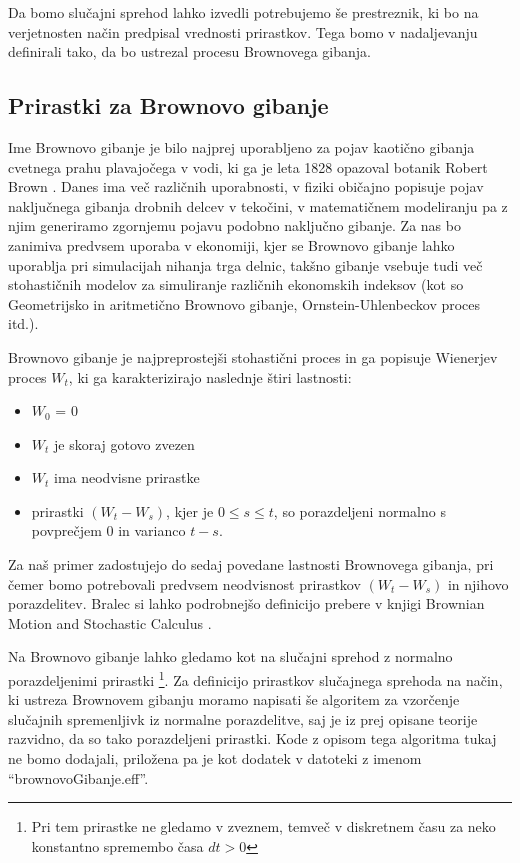 \documentclass[a4paper,12pt]{article}
\theoremstyle{definition} %
\begin{document}
Da bomo slučajni sprehod lahko izvedli potrebujemo še prestreznik, ki bo na verjetnosten način predpisal vrednosti prirastkov. Tega bomo v nadaljevanju definirali tako, da bo ustrezal procesu Brownovega gibanja.

\subsection{Prirastki za Brownovo gibanje}

Ime Brownovo gibanje je bilo najprej uporabljeno za pojav kaotično gibanja cvetnega prahu plavajočega v vodi, ki ga je leta 1828 opazoval botanik Robert Brown \cite{brownovoG}. Danes ima več različnih uporabnosti, v fiziki običajno popisuje pojav naključnega gibanja drobnih delcev v tekočini, v matematičnem modeliranju pa z njim generiramo zgornjemu pojavu podobno naključno gibanje. Za nas bo zanimiva predvsem uporaba v ekonomiji, kjer se Brownovo gibanje lahko uporablja pri simulacijah nihanja trga delnic, takšno gibanje vsebuje tudi več  stohastičnih modelov za simuliranje različnih ekonomskih indeksov (kot so Geometrijsko in aritmetično Brownovo gibanje, Ornstein-Uhlenbeckov proces itd.).

Brownovo gibanje je najpreprostejši stohastični proces in ga popisuje Wienerjev proces $W_t$, ki ga karakterizirajo naslednje štiri lastnosti:
\begin{itemize}
 \item $W_0$ = 0
  \item $W_t$ je skoraj gotovo zvezen
  \item $W_t$ ima neodvisne prirastke
  \item prirastki $(W_t - W_s)$, kjer je $0 \leq s \leq t$, so porazdeljeni normalno s povprečjem 0 in varianco $t - s$.
 \end{itemize}
Za naš primer zadostujejo do sedaj povedane lastnosti Brownovega gibanja, pri čemer bomo potrebovali predvsem neodvisnost prirastkov $(W_t - W_s)$ in njihovo porazdelitev. Bralec si lahko podrobnejšo definicijo prebere v knjigi Brownian Motion and Stochastic Calculus \cite{brownovoG}. 

Na Brownovo gibanje lahko gledamo kot na slučajni sprehod z normalno porazdeljenimi prirastki \footnote{Pri tem prirastke ne gledamo v zveznem, temveč v diskretnem času za neko konstantno spremembo časa $dt > 0$}. Za definicijo prirastkov slučajnega sprehoda na način, ki ustreza Brownovem gibanju moramo napisati še algoritem za vzorčenje slučajnih spremenljivk iz normalne porazdelitve, saj je iz prej opisane teorije razvidno, da so tako porazdeljeni prirastki. Kode z opisom tega algoritma tukaj ne bomo dodajali, priložena pa je kot dodatek v datoteki z imenom "`brownovoGibanje.eff"'.
\end{document}

